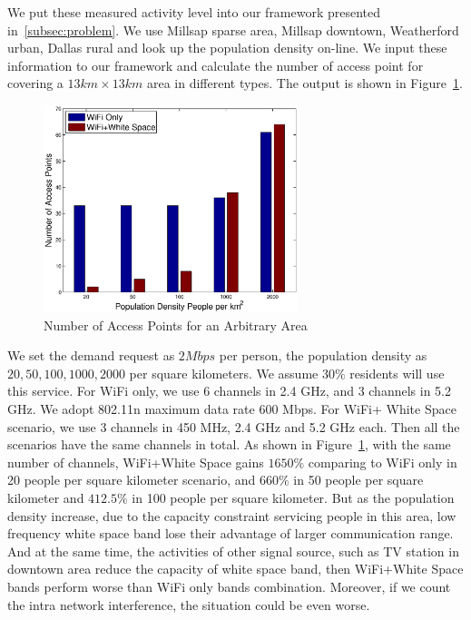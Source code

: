 We put these measured activity level into our framework presented in~\ref{subsec:problem}. We use Millsap
sparse area, Millsap downtown, Weatherford urban, Dallas rural and look up the population density on-line.
We input these information to our framework and calculate the number of access point for covering 
a $13 km \times 13 km$ area in different types. The output is shown in Figure~\ref{fig:redensity}. 

   \begin{figure}
   \centering
   \includegraphics[width=74mm]{figures/redensity}
   \vspace{-0.1in}
   \caption{Number of Access Points for an Arbitrary Area}                                                                 
   \label{fig:redensity}
   \end{figure}

We set the demand request as $2Mbps$ per person, the population
density as $20,50,100,1000,2000$ per square kilometers. We assume $30\%$ residents will use this
service. For WiFi only, we use 6 channels in 2.4 GHz, and 3 channels in 5.2 GHz. 
We adopt 802.11n maximum data rate 600 Mbps. For WiFi+ White Space
scenario, we use 3 channels in 450 MHz, 2.4 GHz and 5.2 GHz each. Then all the scenarios have the 
same channels in total. As shown in Figure~\ref{fig:redensity},
with the same number of channels, WiFi+White Space gains $1650\%$ comparing to WiFi only in 20 people 
per square kilometer scenario, and $660\%$ in 50 people per square kilometer and $412.5\%$ in 100 people
per square kilometer. But as the population density increase, due to the capacity constraint servicing
people in this area, low frequency white space band lose their advantage of larger communication range. 
And at the same time, the activities of other signal source, such as TV station in downtown area reduce
the capacity of white space band, then WiFi+White Space bands perform worse than WiFi only bands combination.
Moreover, if we count the intra network interference, the situation could be even worse.



